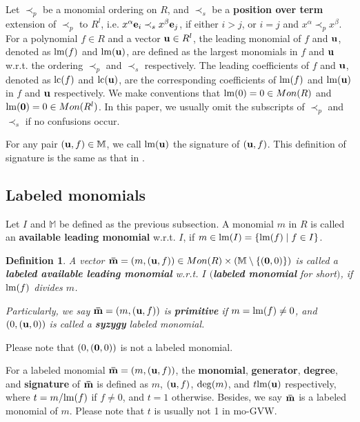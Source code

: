 \documentclass[final, number, 3p,12pt]{elsarticle}
\newtheorem{define}[theorem]{Definition}
\def\M{{\mathbb M}}
\def\brm{{\bf \bar{m}}}
\def\z{{\bf 0}}
\def\lm{{\rm lm}} %
\def\lc{{\rm lc}}
\def\e{{\bf e}}
\def\u{{\bf u}}
\def\deg{{\rm deg}}
\begin{document}
Let $\prec_p$ be a monomial ordering on $R$, and $\prec_s$ be a {\bf position over term} extension of $\prec_p$ to $R^l$, i.e. $x^\alpha\e_i \prec_s x^\beta\e_j$, if either $i > j$, or $i = j$ and $x^\alpha \prec_p x^\beta$. For a polynomial $f\in R$ and a vector $\u\in R^l$, the leading monomial of $f$ and $\u$, denoted as $\lm(f)$ and $\lm(\u)$,  are defined as the largest monomials in $f$ and $\u$ w.r.t. the ordering $\prec_p$ and $\prec_s$ respectively. The leading coefficients of $f$ and $\u$, denoted as $\lc(f)$ and $\lc(\u)$, are the corresponding coefficients of $\lm(f)$ and $\lm(\u)$ in $f$ and $\u$ respectively. We make conventions that $\lm(0) = 0 \in Mon(R)$ and $\lm({\bf 0}) =  0 \in Mon(R^l)$. 
In this paper, we usually omit the subscripts of $\prec_p$ and $\prec_s$ if no confusions occur. 


For any pair $(\u, f) \in \M$, we call $\lm(\u)$ the signature of $(\u, f)$. This definition of signature is the same as that in \citep{Gao10b}.






\subsection{Labeled monomials} \label{subsec_labeledmonomials}

Let $I$ and $\M$ be defined as the previous subsection. A monomial $m$ in $R$ is called an {\bf available leading monomial} w.r.t. $I$, if $m\in \lm(I) = \{\lm(f) \mid f \in I\}$.



\begin{define}
A vector $\brm = (m, (\u, f)) \in Mon(R) \times (\M\setminus \{(\z, 0)\})$ is called a {\bf labeled available leading monomial}  w.r.t. $I$ $(${\bf labeled monomial} for short$)$, if $\lm(f)$ divides $m$. 

Particularly, we say $\brm = (m, (\u, f))$ is {\bf primitive} if $m = \lm(f) \not= 0$, and $(0, (\u, 0))$ is called a {\bf syzygy} labeled monomial. 
\end{define}

Please note that $(0, (\z, 0))$ is not a labeled monomial.


For a labeled monomial $\brm = (m, (\u, f))$, the {\bf monomial}, {\bf generator}, {\bf degree}, and {\bf signature} of $\brm$ is defined as $m$, $(\u, f)$, $\deg(m)$, and $t\lm(\u)$ respectively, where $t = m/\lm(f)$ if $f\not= 0$, and $t = 1$ otherwise. Besides, we say $\brm$ is a labeled monomial of $m$. Please note that $t$ is usually not 1 in  mo-GVW.
\end{document}
